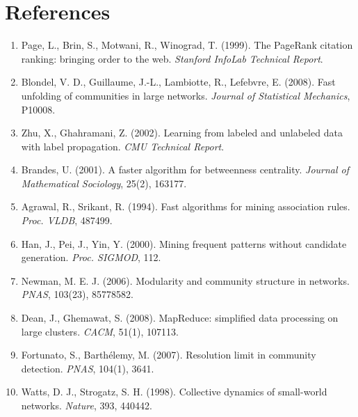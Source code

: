 
\section{References}

\begin{enumerate}
  \item Page, L., Brin, S., Motwani, R., Winograd, T. (1999). The PageRank citation ranking: bringing order to the web. \emph{Stanford InfoLab Technical Report}.
  \item Blondel, V. D., Guillaume, J.-L., Lambiotte, R., Lefebvre, E. (2008). Fast unfolding of communities in large networks. \emph{Journal of Statistical Mechanics}, P10008.
  \item Zhu, X., Ghahramani, Z. (2002). Learning from labeled and unlabeled data with label propagation. \emph{CMU Technical Report}.
  \item Brandes, U. (2001). A faster algorithm for betweenness centrality. \emph{Journal of Mathematical Sociology}, 25(2), 163\textendash{}177.
  \item Agrawal, R., Srikant, R. (1994). Fast algorithms for mining association rules. \emph{Proc. VLDB}, 487\textendash{}499.
  \item Han, J., Pei, J., Yin, Y. (2000). Mining frequent patterns without candidate generation. \emph{Proc. SIGMOD}, 1\textendash{}12.
  \item Newman, M. E. J. (2006). Modularity and community structure in networks. \emph{PNAS}, 103(23), 8577\textendash{}8582.
  \item Dean, J., Ghemawat, S. (2008). MapReduce: simplified data processing on large clusters. \emph{CACM}, 51(1), 107\textendash{}113.
  \item Fortunato, S., Barth\'{e}lemy, M. (2007). Resolution limit in community detection. \emph{PNAS}, 104(1), 36\textendash{}41.
  \item Watts, D. J., Strogatz, S. H. (1998). Collective dynamics of small-world networks. \emph{Nature}, 393, 440\textendash{}442.
\end{enumerate}
